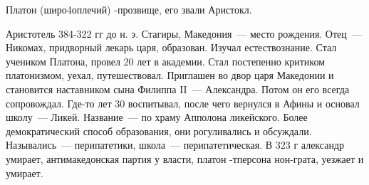 Платон (широ4оплечий) -прозвище, его звали Аристокл. 

Аристотель
384-322 гг до н. э. 
Стагиры, Македония~--- место рождения. Отец~--- Никомах, придворный лекарь царя, образован. 
Изучал естествознание. Стал учеником Платона, провел 20 лет в академии. Стал постепенно критиком платонизмом, уехал, путешествовал. Приглашен во двор царя Македонии и становится наставником сына Филиппа II~--- Александра. 
Потом он его всегда сопровождал. Где-то лет 30 воспитывал, после чего вернулся в Афины и основал школу~--- Ликей. 
Название~--- по храму Апполона ликейского. Более демократический способ образования, они рогуливались и обсуждали. 
Назывались~--- перипатетики, школа~--- перипатетическая. В 323 г александр умирает, антимакедонская партия у власти, платон -тперсона нон-грата, уезжает и умирает. 
 